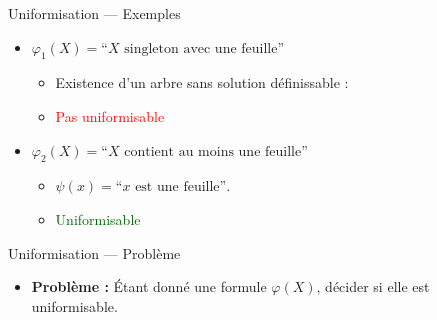 \documentclass[10pt,xcolor=dvipsnames]{beamer}
\newcommand{\red}[1]{\textcolor{red}{#1}}
\newcommand{\darkgreen}[1]{\textcolor{darkgreen}{#1}}
\theoremstyle{plain}
\begin{document}
\begin{frame}{Uniformisation — Exemples}
	\begin{itemize}
		\item $\varphi_1(X) = \text{``$X$ singleton avec une feuille''}$

		      \begin{itemize}
			      \item Existence d’un arbre sans solution définissable :\\
			            \vspace{1em}
			            \begin{center}
			            \end{center}
			      \item \red{Pas uniformisable}
		      \end{itemize}

		      \vspace{1em}

		      \pause

		\item $\varphi_2(X) = \text{``$X$ contient au moins une feuille''}$

		      \begin{itemize}
			      \item $\psi(x) = \text{``$x$ est une feuille''}$.
			      \item \darkgreen{Uniformisable}
		      \end{itemize}
	\end{itemize}
\end{frame}


\begin{frame}{Uniformisation — Problème}
	\begin{itemize}
		\item \textbf{Problème :} Étant donné une formule $\varphi(X)$, décider si elle est uniformisable.
	\end{itemize}
\end{frame}
\end{document}
